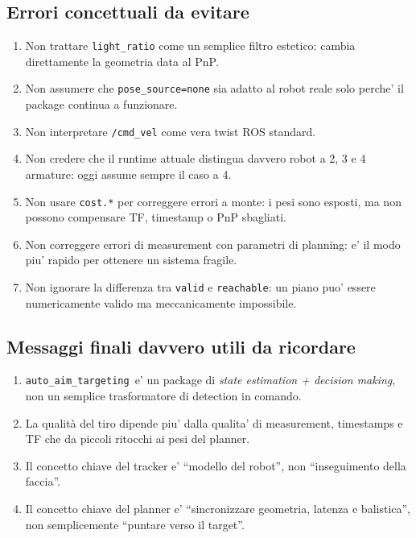 \documentclass[11pt,a4paper]{article}
\newcommand{\pkg}{\texttt{auto\_aim\_targeting}}
\newcommand{\code}[1]{\texttt{#1}}
\newcommand{\topic}[1]{\texttt{#1}}
\begin{document}
\subsection{Errori concettuali da evitare}

\begin{enumerate}[leftmargin=1.4em]
  \item Non trattare \code{light\_ratio} come un semplice filtro estetico: cambia direttamente la geometria data al PnP.
  \item Non assumere che \code{pose\_source=none} sia adatto al robot reale solo perche' il package continua a funzionare.
  \item Non interpretare \topic{/cmd_vel} come vera twist ROS standard.
  \item Non credere che il runtime attuale distingua davvero robot a 2, 3 e 4 armature: oggi assume sempre il caso a 4.
  \item Non usare \code{cost.*} per correggere errori a monte: i pesi sono esposti, ma non possono compensare TF, timestamp o PnP sbagliati.
  \item Non correggere errori di measurement con parametri di planning: e' il modo piu' rapido per ottenere un sistema fragile.
  \item Non ignorare la differenza tra \code{valid} e \code{reachable}: un piano puo' essere numericamente valido ma meccanicamente impossibile.
\end{enumerate}

\subsection{Messaggi finali davvero utili da ricordare}

\begin{enumerate}[leftmargin=1.4em]
  \item \pkg\ e' un package di \emph{state estimation + decision making}, non un semplice trasformatore di detection in comando.
  \item La qualità del tiro dipende piu' dalla qualita' di measurement, timestamps e TF che da piccoli ritocchi ai pesi del planner.
  \item Il concetto chiave del tracker e' ``modello del robot'', non ``inseguimento della faccia''.
  \item Il concetto chiave del planner e' ``sincronizzare geometria, latenza e balistica'', non semplicemente ``puntare verso il target''.
\end{enumerate}
\end{document}

